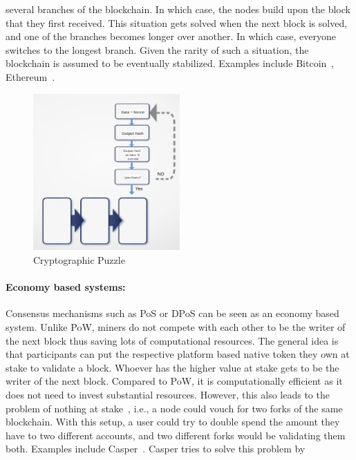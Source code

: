 several branches of the blockchain. In which case, the nodes build upon the
block that they first received. This situation gets solved when the next block
is solved, and one of the branches becomes longer over another. In which case,
everyone switches to the longest branch. Given the rarity of such a situation,
the blockchain is assumed to be eventually stabilized. Examples include
Bitcoin~\cite{Bitcoin_Satoshi}, Ethereum~\cite{buterin2013ethereum}. 
\begin{figure}
	\begin{center}
	\includegraphics[width=0.5\textwidth]{Images/CryptographicPuzzle.eps}
	\caption{Cryptographic Puzzle}
	\label{fig:cryptographicPuzzle}
	\end{center}
\end{figure} \paragraph{Economy based systems:}Consensus mechanisms such as
\ac{PoS} or \ac{DPoS} can be seen as an economy based system. Unlike \ac{PoW},
miners do not compete with each other to be the writer of the next block thus
saving lots of computational resources. The general idea is that participants
can put the respective platform based native token they own at stake to
validate a block. Whoever has the higher value at stake gets to be the writer
of the next block. Compared to PoW, it is computationally efficient as it does
not need to invest substantial resources. However, this also leads to the
problem of nothing at stake~\cite{houy2014will}, i.e., a node could vouch for
two forks of the same blockchain. With this setup, a user could try to double
spend the amount they have to two different accounts, and two different forks
would be validating them both. Examples include
Casper~\cite{buterin2017casper}. Casper tries to solve this problem by
